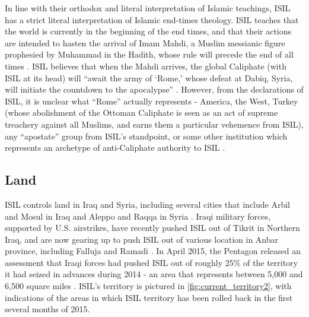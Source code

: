 \documentclass{report}
\begin{document}
    In line with their  orthodox and literal interpretation of Islamic teachings, ISIL  has a strict literal interpretation of Islamic  end-times theology. ISIL teaches that the world is currently in the beginning of the end times, and that their actions are intended to hasten the arrival of Imam Mahdi, a Muslim messianic figure prophesied by Muhammad in the Hadith, whose rule will precede the end of all times \cite{arabi2008divine,Wood2015}. ISIL believes that when the Mahdi arrives, the global Caliphate (with ISIL at its head)  will \enquote{await the army of \enquote{Rome,} whose defeat at Dabiq, Syria, will initiate the countdown to the apocalypse} \cite{Wood2015}. However, from the declarations of ISIL, it is unclear what \enquote{Rome} actually represents - America, the West, Turkey (whose abolishment of the Ottoman Caliphate is seen as an act of supreme treachery against all Muslims, and earns them a particular vehemence from ISIL), any \enquote{apostate} group from ISIL's standpoint, or some other institution which represents an archetype of anti-Caliphate authority to ISIL \cite{Mortada2014,Wood2015}. 
    
    
    


\subsection{Land}

ISIL controls land in Iraq and Syria, including several cities that include Arbil and Mosul in Iraq and Aleppo and Raqqa in Syria \cite{McFate2015}.  Iraqi military forces, supported by U.S. airstrikes, have recently pushed ISIL out of Tikrit in Northern Iraq, and are now gearing up to push ISIL out of various location in Anbar province, including Falluja and Ramadi \cite{Nordland2015}.  In April 2015, the Pentagon released an assessment that Iraqi forces had pushed ISIL out of roughly 25\% of the territory it had seized in advances during 2014 - an area that represents between 5,000 and 6,500 square miles \cite{Michaels2015}.  ISIL's territory is pictured in \autoref{fig:current_territory2}, with indications of the areas in which ISIL territory has been rolled back in the first several months of 2015. 
\end{document}
